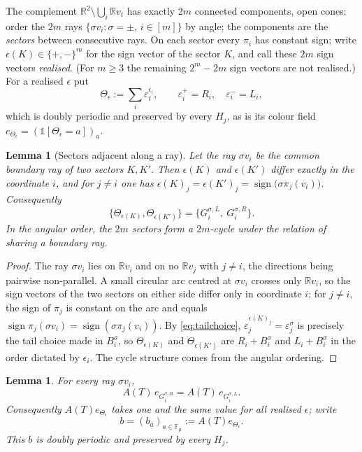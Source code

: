 \documentclass[11pt,reqno]{amsart}
\theoremstyle{plain}
\newtheorem{lem}[thm]{Lemma}
\theoremstyle{definition}
\theoremstyle{remark}
\theoremstyle{plain}
\theoremstyle{remark}
\theoremstyle{definition}
\numberwithin{equation}{section}
\DeclareMathOperator{\sgn}{sign}
\newcommand{\R}{\mathbb{R}}
\newcommand{\Fp}{\mathbb{F}_p}
\newcommand{\one}{\mathbb{1}}
\begin{document}
The complement $\R^2\setminus\bigcup_i\R v_i$ has exactly $2m$ connected
components, open cones: order the $2m$ rays $\{\sigma v_i:\sigma=\pm,\,i\in[m]\}$
by angle; the components are the \emph{sectors} between consecutive rays.  On
each sector every $\pi_i$ has constant sign; write $\epsilon(K)\in\{+,-\}^m$ for
the sign vector of the sector $K$, and call these $2m$ sign vectors
\emph{realised}.  (For $m\ge3$ the remaining $2^m-2m$ sign vectors are not
realised.)  For a realised $\epsilon$ put
\[\Theta_\epsilon:=\sum_i\varepsilon_i^{\epsilon_i},\qquad
  \varepsilon_i^{+}=R_i,\quad \varepsilon_i^{-}=L_i,\]
which is doubly periodic and preserved by every $H_j$, as is its colour field
$e_{\Theta_\epsilon}=(\one[\Theta_\epsilon=a])_a$.

\begin{lem}[Sectors adjacent along a ray]\label{lem:adjacent}
Let the ray $\sigma v_i$ be the common boundary ray of two sectors $K,K'$.
Then $\epsilon(K)$ and $\epsilon(K')$ differ exactly in the coordinate $i$, and
for $j\ne i$ one has
$\epsilon(K)_j=\epsilon(K')_j=\sgn\bigl(\sigma\pi_j(v_i)\bigr)$.  Consequently
\[\{\Theta_{\epsilon(K)},\Theta_{\epsilon(K')}\}=\{G_i^{\sigma,L},\ G_i^{\sigma,R}\}.\]
In the angular order, the $2m$ sectors form a $2m$-cycle under the relation of
sharing a boundary ray.
\end{lem}

\begin{proof}
The ray $\sigma v_i$ lies on $\R v_i$ and on no $\R v_j$ with $j\ne i$, the
directions being pairwise non-parallel.  A small circular arc centred at
$\sigma v_i$ crosses only $\R v_i$, so the sign vectors of the two sectors on
either side differ only in coordinate $i$; for $j\ne i$, the sign of $\pi_j$ is
constant on the arc and equals
$\sgn\pi_j(\sigma v_i)=\sgn(\sigma\pi_j(v_i))$.  By \eqref{eq:tailchoice},
$\varepsilon_j^{\epsilon(K)_j}=\varepsilon_j^\sigma$ is precisely the tail
choice made in $B_i^\sigma$, so $\Theta_{\epsilon(K)}$ and
$\Theta_{\epsilon(K')}$ are $R_i+B_i^\sigma$ and $L_i+B_i^\sigma$ in the order
dictated by $\epsilon_i$.  The cycle structure comes from the angular ordering.
\end{proof}

\begin{lem}\label{lem:Ae-sectors}
For every ray $\sigma v_i$,
\[A(T)\,e_{G_i^{\sigma,R}}=A(T)\,e_{G_i^{\sigma,L}} .\]
Consequently $A(T)e_{\Theta_\epsilon}$ takes one and the same value for all
\emph{realised} $\epsilon$; write
\[b=(b_a)_{a\in\Fp}:=A(T)e_{\Theta_\epsilon}.\]
This $b$ is doubly periodic and preserved by every $H_j$.
\end{lem}
\end{document}
